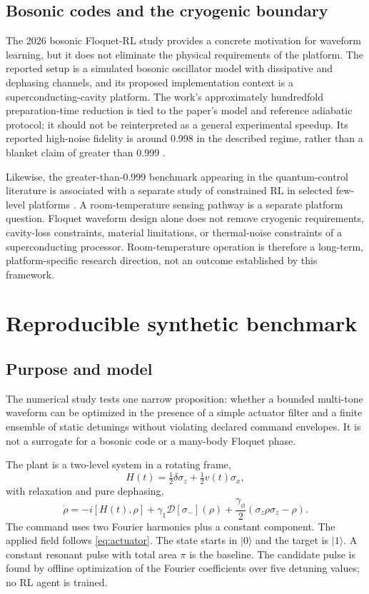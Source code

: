 \documentclass[10pt,twoside]{article}
\newcommand{\D}{\mathcal D}
\begin{document}
\subsection{Bosonic codes and the cryogenic boundary}

The 2026 bosonic Floquet-RL study provides a concrete motivation for waveform learning, but it does not eliminate the physical requirements of the platform. The reported setup is a simulated bosonic oscillator model with dissipative and dephasing channels, and its proposed implementation context is a superconducting-cavity platform. The work's approximately hundredfold preparation-time reduction is tied to the paper's model and reference adiabatic protocol; it should not be reinterpreted as a general experimental speedup. Its reported high-noise fidelity is around 0.998 in the described regime, rather than a blanket claim of greater than 0.999 \citep{wu2026autonomous}.

Likewise, the greater-than-0.999 benchmark appearing in the quantum-control literature is associated with a separate study of constrained RL in selected few-level platforms \citep{ernst2025physicsconstraints}. A room-temperature sensing pathway is a separate platform question. Floquet waveform design alone does not remove cryogenic requirements, cavity-loss constraints, material limitations, or thermal-noise constraints of a superconducting processor. Room-temperature operation is therefore a long-term, platform-specific research direction, not an outcome established by this framework.

\section{Reproducible synthetic benchmark}

\subsection{Purpose and model}

The numerical study tests one narrow proposition: whether a bounded multi-tone waveform can be optimized in the presence of a simple actuator filter and a finite ensemble of static detunings without violating declared command envelopes. It is not a surrogate for a bosonic code or a many-body Floquet phase.

The plant is a two-level system in a rotating frame,
\begin{equation}
H(t)=\tfrac12\delta\sigma_z+\tfrac12 v(t)\sigma_x,
\end{equation}
with relaxation and pure dephasing,
\begin{equation}
\dot\rho=-i[H(t),\rho]+\gamma_1\D[\sigma_-](\rho)
+\frac{\gamma_\phi}{2}(\sigma_z\rho\sigma_z-\rho).
\label{eq:qubitmodel}
\end{equation}
The command uses two Fourier harmonics plus a constant component. The applied field follows \cref{eq:actuator}. The state starts in $|0\rangle$ and the target is $|1\rangle$. A constant resonant pulse with total area $\pi$ is the baseline. The candidate pulse is found by offline optimization of the Fourier coefficients over five detuning values; no RL agent is trained.
\end{document}
